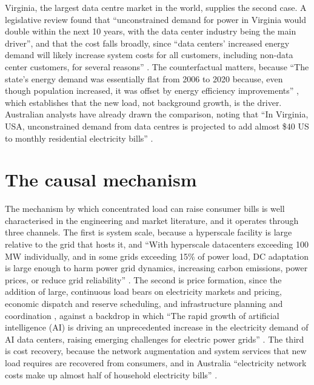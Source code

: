 Virginia, the largest data centre market in the world, supplies the second case. A legislative review found that \enquote{unconstrained demand for power in Virginia would double within the next 10 years, with the data center industry being the main driver}, and that the cost falls broadly, since \enquote{data centers' increased energy demand will likely increase system costs for all customers, including non-data center customers, for several reasons} \autocite{jlarcVirginiaDataCentres2024}. The counterfactual matters, because \enquote{The state's energy demand was essentially flat from 2006 to 2020 because, even though population increased, it was offset by energy efficiency improvements} \autocite{jlarcVirginiaDataCentres2024}, which establishes that the new load, not background growth, is the driver. Australian analysts have already drawn the comparison, noting that \enquote{In Virginia, USA, unconstrained demand from data centres is projected to add almost \$40 US to monthly residential electricity bills} \autocite{ecaConsumerImpactsDataCentres2025}.

\section{The causal mechanism}
\label{sec:supp:gen:mechanism}

The mechanism by which concentrated load can raise consumer bills is well characterised in the engineering and market literature, and it operates through three channels. The first is system scale, because a hyperscale facility is large relative to the grid that hosts it, and \enquote{With hyperscale datacenters exceeding 100 MW individually, and in some grids exceeding 15\% of power load, DC adaptation is large enough to harm power grid dynamics, increasing carbon emissions, power prices, or reduce grid reliability} \autocite{linAdaptingDatacenterCapacity2023}. The second is price formation, since the addition of large, continuous load bears on electricity markets and pricing, economic dispatch and reserve scheduling, and infrastructure planning and coordination \autocite{shengPowerAIData2026}, against a backdrop in which \enquote{The rapid growth of artificial intelligence (AI) is driving an unprecedented increase in the electricity demand of AI data centers, raising emerging challenges for electric power grids} \autocite{chenElectricityDemandGrid2025}. The third is cost recovery, because the network augmentation and system services that new load requires are recovered from consumers, and in Australia \enquote{electricity network costs make up almost half of household electricity bills} \autocite{ecaDataCentresEnergyLandscape2025}.

